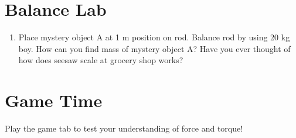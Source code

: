 \documentclass{article}
\begin{document}
\section{Balance Lab}

\begin{enumerate}
\item Place mystery object A at 1 m position on rod. Balance rod by using 20 kg boy. How can you
find mass of mystery object A? Have you ever thought of how does seesaw scale at grocery
shop works?
\end{enumerate}

\section{Game Time}

Play the game tab to test your understanding of force and torque!
\end{document}
